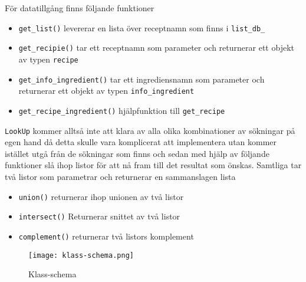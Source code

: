 För datatillgång finns följande funktioner

\begin{itemize}
\item   \verb+get_list()+ levererar en lista över receptnamn som finns i \verb+list_db_+

\item   \verb+get_recipie()+ tar ett receptnamn som parameter och returnerar ett 
        objekt av typen \verb+recipe+

\item   \verb+get_info_ingredient()+ tar ett ingrediensnamn som parameter och returnerar 
        ett objekt av typen \verb+info_ingredient+

\item   \verb+get_recipe_ingredient()+ hjälpfunktion till \verb+get_recipe+
\end{itemize}

\verb+LookUp+ kommer alltså inte att klara av alla olika kombinationer av
sökningar på egen hand då detta skulle vara komplicerat att implementera utan
kommer istället utgå från de sökningar som finns och sedan med hjälp
av följande funktioner slå ihop listor för att nå fram till det
resultat som önskas. Samtliga tar två listor som parametrar och
returnerar en sammanslagen lista

\begin{itemize}
\item   \verb+union()+ returnerar ihop unionen av två listor
\item   \verb+intersect()+ Returnerar snittet av två listor
\item   \verb+complement()+ returnerar två listors komplement
\end{itemize}

\begin{figure}[h]
\centering
\texttt{[image: klass-schema.png]}
\caption{Klass-schema}
\label{fig:classes}
\end{figure}

